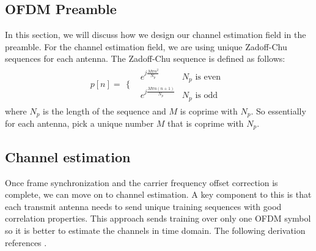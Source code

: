 \documentclass{book}
\begin{document}
\subsection{OFDM Preamble}
In this section, we will discuss how we design our channel estimation field in the preamble. For the channel estimation field, we are using unique Zadoff-Chu sequences for each antenna. The Zadoff-Chu sequence is defined as follows:
\[
p[n] = 
        \begin{array}{cc}
 \Bigg\{ & 
        \begin{array}{cc}
          e^{j\frac{M\pi n^2}{N_p}} & N_p \textrm{ is even}\\ [0.5em]
          e^{j\frac{M\pi n(n+1)}{N_p}} & N_p \textrm{ is odd}
        \end{array}
    \end{array}
\]
where $N_p$ is the length of the sequence and $M$ is coprime with $N_p$. So essentially for each antenna, pick a unique number $M$ that is coprime with $N_p$. 

\subsection{Channel estimation}
    Once frame synchronization and the carrier frequency offset correction is complete, we can move on to channel estimation. A key component to this is that each transmit antenna needs to send unique training sequences with good correlation properties. This approach sends training over only one OFDM symbol so it is better to estimate the channels in time domain. The following derivation references \cite[Chapter 6, Section 5.4]{Hea:Introduction-to-Wireless-Digital:17}.
    
\end{document}
